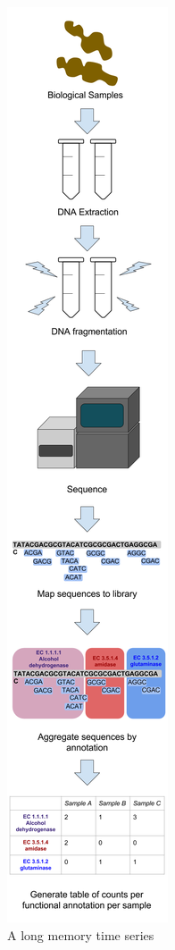 \begin{figure}[h]
\begin{center}
\includegraphics[height=0.8\textheight]{Metagenomic_pipeline.png}
\caption{A long memory time series\label{ts1}}
\end{center}
\end{figure}

